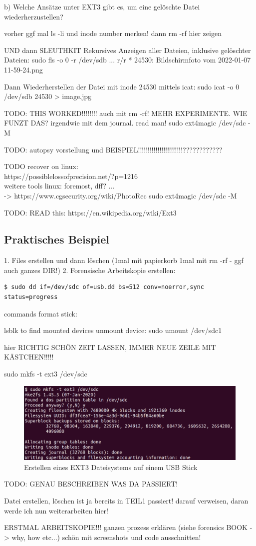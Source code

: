b) Welche Ansätze unter EXT3 gibt es, um eine gelöschte Datei wiederherzustellen?

vorher ggf mal ls -li und inode number merken!
dann rm -rf hier zeigen

UND dann SLEUTHKIT
Rekursives Anzeigen aller Dateien, inklusive gelöschter Dateien:
sudo fls -o 0 -r /dev/sdb
...
r/r * 24530:	Bildschirmfoto vom 2022-01-07 11-59-24.png

Dann Wiederherstellen der Datei mit inode 24530 mittels icat:
sudo icat -o 0 /dev/sdb 24530 > image.jpg


TODO: THIS WORKED!!!!!!!! auch mit rm -rf! MEHR EXPERIMENTE. WIE FUNZT DAS?
irgendwie mit dem journal. read man!
sudo ext4magic /dev/sdc -M




TODO: autopsy vorstellung und BEISPIEL!!!!!!!!!!!!!!!!!!!!!!!????????????

TODO recover on linux:\\
	https://possiblelossofprecision.net/?p=1216\\
	weitere tools linux: foremost, dff? ...\\
		-> https://www.cgsecurity.org/wiki/PhotoRec
	sudo ext4magic /dev/sdc -M

TODO:
READ this: https://en.wikipedia.org/wiki/Ext3




\subsection{Praktisches Beispiel}

1. Files erstellen und dann löschen (1mal mit papierkorb 1mal mit rm -rf - ggf auch ganzes DIR!)
2. Forensische Arbeitskopie erstellen:

\begin{lstlisting}
$ sudo dd if=/dev/sdc of=usb.dd bs=512 conv=noerror,sync status=progress
\end{lstlisting}

commands format stick:

lsblk to find mounted devices
unmount device:  sudo umount /dev/sdc1

hier RICHTIG SCHÖN ZEIT LASSEN, IMMER NEUE ZEILE MIT KÄSTCHEN!!!!!

sudo mkfs -t ext3 /dev/sdc
\begin{figure}[H]
	\centering
	\includegraphics[width=12cm,keepaspectratio=true]{pictures/createfs.png}
	\caption{
		Erstellen eines EXT3 Dateisystems auf einem USB Stick
	}
	\label{fig:createfs}
\end{figure}
TODO: GENAU BESCHREIBEN WAS DA PASSIERT!



Datei erstellen, löschen ist ja bereits in TEIL1 passiert! darauf verweisen, daran werde ich nun weiterarbeiten hier!

ERSTMAL ARBEITSKOPIE!!! ganzen prozess erklären (siehe forensics BOOK -> why, how etc...)
schön mit screenshots und code ausschnitten!
